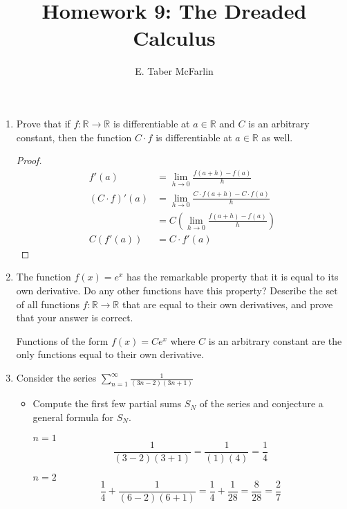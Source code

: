\documentclass[12pt,a4paper,reqno,parskip=full]{amsart}
\numberwithin{equation}{section}
\theoremstyle{plain}
\theoremstyle{definition}
\begin{document}
\title{Homework 9: The Dreaded Calculus}

\author{E. Taber McFarlin}

\maketitle

\begin{enumerate}
  \item Prove that if $f:\mathbb{R}\to\mathbb{R}$ is differentiable at
        $a\in\mathbb{R}$ and $C$ is an arbitrary constant, then the function
        $C\cdot f$ is differentiable at $a\in\mathbb{R}$ as well.

        \begin{proof}
          \begin{align*}
            f'(a)          & = \lim_{h\to 0}\frac{f(a + h) - f(a)}{h}               \\
            (C\cdot f)'(a) & = \lim_{h\to 0}\frac{C\cdot f(a + h) - C\cdot f(a)}{h} \\
                           & = C\left(\lim_{h\to 0}\frac{f(a + h) - f(a)}{h}\right) \\
            C(f'(a))       & = C\cdot f'(a)
          \end{align*}
        \end{proof}
  \item The function $f(x)=e^x$ has the remarkable property that it is equal to
        its own derivative. Do any other functions have this property? Describe
        the set of all functions $f:\mathbb{R} \to\mathbb{R}$ that are equal to
        their own derivatives, and prove that your answer is correct.

        Functions of the form $f(x) = Ce^x$ where $C$ is an arbitrary constant
        are the only functions equal to their own derivative.
  \item Consider the series
        $\displaystyle\sum_{n=1}^\infty\frac{1}{(3n-2)(3n+1)}$
        \begin{itemize}
          \item Compute the first few partial sums $S_N$ of the series and
                conjecture a general formula for $S_N$.

                $n = 1$
                \[\frac{1}{(3 - 2)(3 + 1)} = \frac{1}{(1)(4)} = \frac{1}{4}\]

                $n = 2$
                \[
                  \frac{1}{4} + \frac{1}{(6 - 2)(6 + 1)} =
                  \frac{1}{4} + \frac{1}{28} = \frac{8}{28} = \frac{2}{7}
                \]


\end{itemize}
\end{enumerate}
\end{document}
